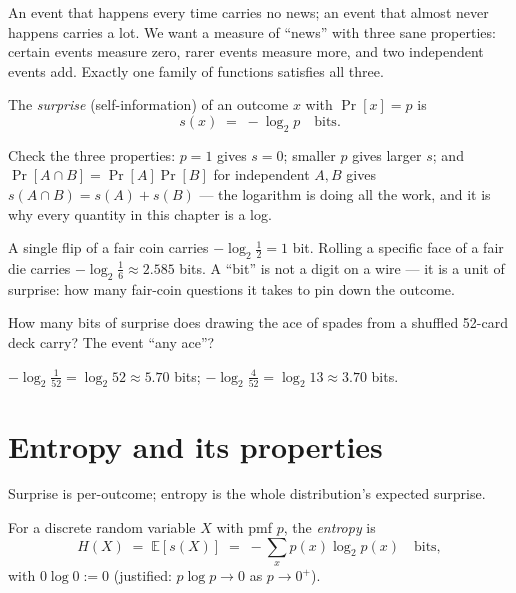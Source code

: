 An event that happens every time carries no news; an event that almost
never happens carries a lot. We want a measure of ``news'' with three
sane properties: certain events measure zero, rarer events measure
more, and two independent events add. Exactly one family of functions
satisfies all three.

\begin{definition}[Surprise]\label{def:surprise}
The \emph{surprise} (self-information) of an outcome
$x$ with $\Pr[x]=p$ is
\[
  s(x) \;=\; -\log_2 p \quad\text{bits}.
\]
\end{definition}

Check the three properties: $p=1$ gives $s=0$; smaller $p$ gives larger
$s$; and $\Pr[A\cap B]=\Pr[A]\Pr[B]$ for independent $A,B$ gives
$s(A\cap B)=s(A)+s(B)$ --- the logarithm is doing all the work, and it
is why every quantity in this chapter is a log.

A single flip of a fair coin carries $-\log_2\tfrac12=1$ bit. Rolling a
specific face of a fair die carries $-\log_2\tfrac16\approx 2.585$
bits. A ``bit'' is not a digit on a wire --- it is a unit of
surprise: how many fair-coin questions it takes to pin down the
outcome.

\begin{exercise}[easy]
How many bits of surprise does drawing the ace of spades from a shuffled
52-card deck carry? The event ``any ace''?
\end{exercise}

\begin{solution}
$-\log_2\tfrac1{52}=\log_2 52\approx 5.70$ bits;
$-\log_2\tfrac4{52}=\log_2 13\approx 3.70$ bits.
\end{solution}

\section{Entropy and its properties}\label{sec:info-entropy}

Surprise is per-outcome; entropy is the whole distribution's expected
surprise.

\begin{definition}[Entropy]\label{def:entropy}
For a discrete random variable $X$ with pmf $p$, the
\emph{entropy} is
\[
  H(X) \;=\; \mathbb E[s(X)] \;=\; -\sum_x p(x)\log_2 p(x)
  \quad\text{bits},
\]
with $0\log 0 := 0$ (justified: $p\log p\to 0$ as $p\to0^+$).
\end{definition}

